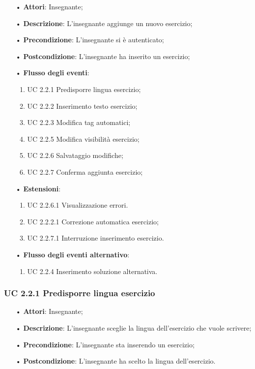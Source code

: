 \begin{itemize}
	\item[•] \textbf{Attori}: Insegnante;
	\item[•] \textbf{Descrizione}: L'insegnante aggiunge un nuovo esercizio;
	\item[•] \textbf{Precondizione}: L'insegnante si è autenticato;
	\item[•] \textbf{Postcondizione}: L'insegnante ha inserito un esercizio;
	\item[•] \textbf{Flusso degli eventi}:
	\begin{enumerate}
		\item UC 2.2.1 Predisporre lingua esercizio;
		\item UC 2.2.2 Inserimento testo esercizio;
		\item UC 2.2.3 Modifica tag automatici;

		\item UC 2.2.5 Modifica visibilità esercizio;
		\item UC 2.2.6 Salvataggio modifiche;
		\item UC 2.2.7 Conferma aggiunta esercizio;
	\end{enumerate}
	\item[•] \textbf{Estensioni}:	
	\begin{enumerate}
		\item UC 2.2.6.1 Visualizzazione errori.
		\item UC 2.2.2.1 Correzione automatica esercizio;
		\item UC 2.2.7.1 Interruzione inserimento esercizio.
	\end{enumerate}
	\item[•] \textbf{Flusso degli eventi alternativo}:
	\begin{enumerate}
		\item UC 2.2.4 Inserimento soluzione alternativa.
	\end{enumerate}
\end{itemize}
\subsubsection{UC 2.2.1 Predisporre lingua esercizio}
\begin{itemize}
	\item[•] \textbf{Attori}: Insegnante;
	\item[•] \textbf{Descrizione}: L'insegnante sceglie la lingua dell’esercizio che vuole scrivere;
	\item[•] \textbf{Precondizione}: L'insegnante sta inserendo un esercizio;
	\item[•] \textbf{Postcondizione}: L'insegnante ha scelto la lingua dell'esercizio.
\end{itemize}
